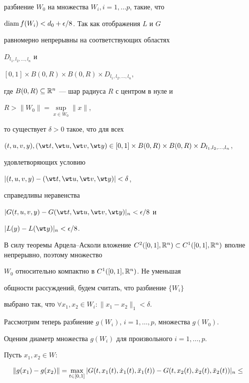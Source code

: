 \begin{pf}
\begin{pf}
разбиение $W_0$ на множества $W_i, i=1,\dotsc p$, такие, что


$\operatorname{diam} f(W_i) <d_0 + \epsilon /8$. Так как отображения $L$ и $G$


равномерно непрерывны на соответствующих областях


$D_{l_1, l_2, \dotsc, l_n}$ и


$[0,1]\times B(0,R)\times B(0,R)\times D_{l_1, l_2, \dotsc, l_n}$, 


где $B(0,R)\subseteq {\Bbb R}^n$ --- шар радиуса $R$ с центром в нуле и


$R>\|W_0\|=\sup\limits_{x\in W_0}\|x\|$,


то существует $\delta >0$ такое, что для всех 


$(t,u,v,y), (\wt t,\wt u, \wt v, \wt y) \in


[0,1]\times B(0,R)\times B(0,R)\times D_{l_1, l_2, \dotsc, l_n}$,


удовлетворяющих условию 


$|(t,u,v,y)-(\wt t,\wt u, \wt v, \wt y)| <\delta$,


справедливы неравенства


$|G(t,u,v,y)-G(\wt t,\wt u, \wt v, \wt y)|_n <\epsilon /8$ и


$|L(y) - L(\wt y)|_n < \epsilon / 8$.


В силу теоремы Арцела--Асколи вложение $C^2([0,1], {\Bbb R}^n)


\subset C^1([0,1], {\Bbb R}^n)$ вполне непрерывно, поэтому множество 


$W_0$ относительно компактно в $C^1([0,1], {\Bbb R}^n)$. Не уменьшая


общности рассуждений, будем считать, что разбиение $\{W_i\}$


выбрано так, что $\forall x_1, x_2 \in W_i: \|x_1-x_2 \|_1 <\delta$.





Рассмотрим теперь разбиение $g(W_i)$, $i=1, \dotsc, p$, множества $g(W_0)$. 


Оценим диаметр множества $g(W_i)$ для произвольного $i=1, \dotsc, p$.


Пусть $x_1, x_2 \in W$:


\begin{multline*}


\|g(x_1)- g(x_2)\| = \max\limits_{t\in [0,1]}|G(t, x_1(t), 


\Dot x_1(t), \Ddot x_1(t)) - G(t, x_2(t),


\Dot x_2(t), \Ddot x_2(t))|_n\leq \\



\end{multline*}
\end{pf}
\end{pf}
